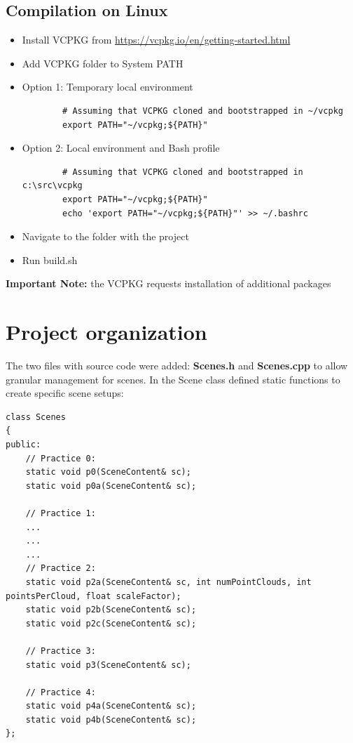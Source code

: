 \documentclass[12pt,a4paper,english]{article}
\begin{document}
\subsection{Compilation on Linux}

\begin{itemize}
    \item Install VCPKG from \url{https://vcpkg.io/en/getting-started.html}
    \item Add VCPKG folder to System PATH
    \item Option 1: Temporary local environment
          \begin{verbatim}
        # Assuming that VCPKG cloned and bootstrapped in ~/vcpkg
        export PATH="~/vcpkg;${PATH}"
    \end{verbatim}

    \item Option 2: Local environment and Bash profile
          \begin{verbatim}
        # Assuming that VCPKG cloned and bootstrapped in c:\src\vcpkg
        export PATH="~/vcpkg;${PATH}"
        echo 'export PATH="~/vcpkg;${PATH}"' >> ~/.bashrc
    \end{verbatim}

    \item Navigate to the folder with the project
    \item Run build.sh
\end{itemize}
\textbf{Important Note:} the VCPKG requests installation of additional packages

\section{Project organization}

The two files with source code were added: \textbf{Scenes.h} and \textbf{Scenes.cpp} to allow granular management for scenes.
In the Scene class defined static functions to create specific scene setups:

\begin{verbatim}
class Scenes
{
public:
    // Practice 0:
    static void p0(SceneContent& sc);
    static void p0a(SceneContent& sc);

    // Practice 1:
    ...
    ...
    ...
    // Practice 2:
    static void p2a(SceneContent& sc, int numPointClouds, int pointsPerCloud, float scaleFactor);
    static void p2b(SceneContent& sc);
    static void p2c(SceneContent& sc);

    // Practice 3:
    static void p3(SceneContent& sc);

    // Practice 4:
    static void p4a(SceneContent& sc);
    static void p4b(SceneContent& sc);
};
\end{verbatim}
\end{document}

